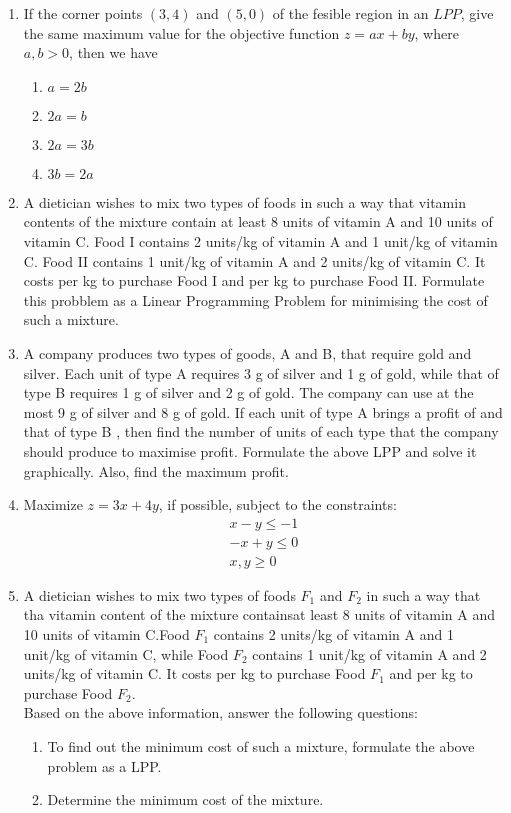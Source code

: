\begin{enumerate}
\item If the corner points $(3, 4)$ and $(5, 0)$ of the fesible region in an $LPP$, give the same maximum value for the objective function $z = ax + by$, where $a, b > 0$, then we have
\begin{enumerate}
\item $a = 2b$
\item $2a = b$
\item $2a = 3b$
\item $3b = 2a$
\end{enumerate}

\item A dietician wishes to mix two types of foods in such a way that vitamin contents of the mixture contain at least 8 units of vitamin A and 10 units of vitamin C. Food I contains 2 units/kg of vitamin A and 1 unit/kg of vitamin C. Food II contains 1 unit/kg of vitamin A and 2 units/kg of vitamin C. It costs  per kg to purchase Food I and  per kg to purchase Food II. Formulate this probblem as a Linear Programming Problem for minimising the cost of such a mixture.

\item A company produces two types of goods, A and B, that require gold and silver. Each unit of type A requires 3 g of silver and 1 g of gold, while that of type B requires 1 g of silver and 2 g of gold. The company can use at the most 9 g of silver and 8 g of gold. If each unit of type A brings a profit of  and that of type B , then find the number of units of each type that the company should produce to maximise profit. 
Formulate the above LPP and solve it graphically. Also, find the maximum profit.

\item Maximize $z = 3x + 4y$, if possible,
	subject to the constraints:
		\begin{align}
			x - y \leq -1 \\
			-x + y \leq 0 \\
			x, y \geq 0
		\end{align}

\item A dietician wishes to mix two types of foods $F_1$ and $F_2$ in such a way that tha vitamin content of the mixture containsat least 8 units of vitamin A and 10 units of vitamin C.Food $F_1$ contains 2 units/kg of vitamin A and 1 unit/kg of vitamin C, while Food $F_2$ contains 1 unit/kg of vitamin A and 2 units/kg of vitamin C. It costs  per kg to purchase Food $F_1$ and  per kg to purchase Food $F_2$.\\
Based on the above information, answer the following questions:
\begin{enumerate}
	\item To find out the minimum cost of such a mixture, formulate the above problem as a LPP.
	\item Determine the minimum cost of the mixture.
\end{enumerate}



\end{enumerate}
